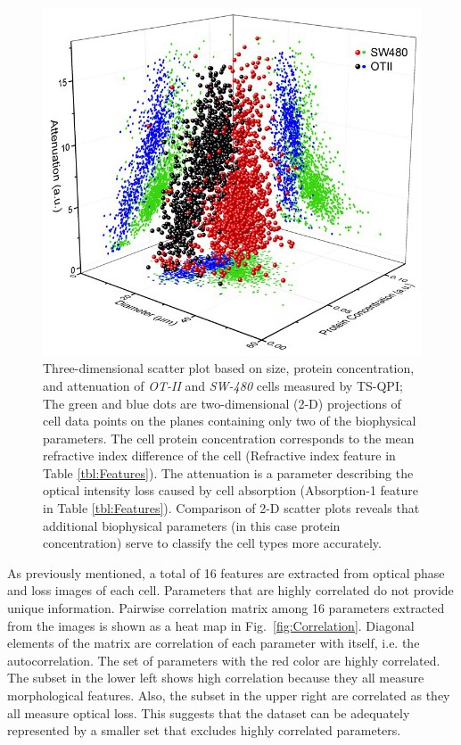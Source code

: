 \documentclass[aps,pra,reprint,superscriptaddress]{revtex4-1}
\begin{document}
\begin{figure}
\includegraphics[scale=0.6]{FigureOTSWScatter.jpg}
\caption{\label{fig:OTSWScatter} Three-dimensional scatter plot based on size, protein concentration, and attenuation of \textit{OT-II} and \textit{SW-480} cells measured by TS-QPI; The green and blue dots are two-dimensional (2-D) projections of cell data points on the planes containing only two of the biophysical parameters. The cell protein concentration corresponds to the mean refractive index difference of the cell (Refractive index feature in Table \ref{tbl:Features}). The attenuation is a parameter describing the optical intensity loss caused by cell absorption (Absorption-1 feature in Table \ref{tbl:Features}). Comparison of 2-D scatter plots reveals that additional biophysical parameters (in this case protein concentration) serve to classify the cell types more accurately.}
\end{figure}

As previously mentioned, a total of 16 features are extracted from optical phase and loss images of each cell. Parameters that are highly correlated do not provide unique information. Pairwise correlation matrix among 16 parameters extracted from the images is shown as a heat map in Fig.~\ref{fig:Correlation}. Diagonal elements of the matrix are correlation of each parameter with itself, i.e. the autocorrelation. The set of parameters with the red color are highly correlated. The subset in the lower left shows high correlation because they all measure morphological features. Also, the subset in the upper right are correlated as they all measure optical loss. This suggests that the dataset can be adequately represented by a smaller set that excludes highly correlated parameters.
\end{document}
